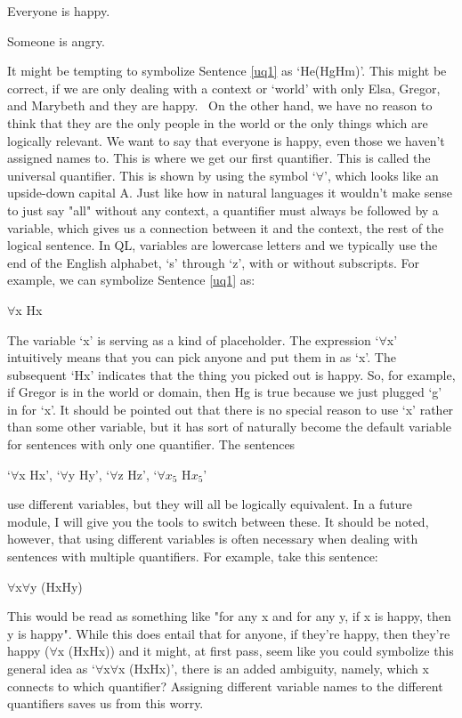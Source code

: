 \begin{earg}
\item[\ex{uq1}] Everyone is happy.
\item[\ex{eq1}] Someone is angry.
\end{earg}
It might be tempting to symbolize Sentence \ref{uq1} as ‘He\eand (Hg\eand Hm)’. This might be correct, if we are only dealing with a context or ‘world' with only Elsa, Gregor, and Marybeth and they are happy.  On the other hand, we have no reason to think that they are the only people in the world or the only things which are logically relevant. We want to say that everyone is happy, even those we haven't assigned names to. This is where we get our first quantifier. This is called the \gls{universal quantifier}. This is shown by using the symbol ‘$\forall$’, which looks like an upside-down capital A. Just like how in natural languages it wouldn't make sense to just say "all" without any context, a quantifier must always be followed by a variable, which gives us a connection between it and the context, the rest of the logical sentence. In QL, variables are lowercase letters and we typically use the end of the English alphabet, ‘s’ through ‘z’, with or without subscripts. For example, we can symbolize Sentence \ref{uq1} as:
\begin{center}
$\forall$x Hx
\end{center}
The variable ‘x’ is serving as a kind of placeholder. The expression ‘$\forall$x’ intuitively means that you can pick anyone and put them in as ‘x’. The subsequent ‘Hx’ indicates that the thing you picked out is happy. So, for example, if Gregor is in the world or domain, then Hg is true because we just plugged ‘g' in for ‘x'. It should be pointed out that there is no special reason to use ‘x’ rather than some other variable, but it has sort of naturally become the default variable for sentences with only one quantifier. The sentences 
\begin{center}
‘$\forall$x Hx’, ‘$\forall$y Hy’, ‘$\forall$z Hz’, ‘$\forall$$x_5$ H$x_5$’ 
\end{center}
use different variables, but they will all be logically equivalent. In a future module, I will give you the tools to switch between these. It should be noted, however, that using different variables is often necessary when dealing with sentences with multiple quantifiers. For example, take this sentence:
\begin{center}
$\forall$x$\forall$y (Hx\eif Hy)
\end{center}
This would be read as something like "for any x and for any y, if x is happy, then y is happy". While this does entail that for anyone, if they're happy, then they're happy ($\forall$x (Hx\eif Hx)) and it might, at first pass, seem like you could symbolize this general idea as ‘$\forall$x$\forall$x (Hx\eif Hx)', there is an added ambiguity, namely, which x connects to which quantifier? Assigning different variable names to the different quantifiers saves us from this worry.

